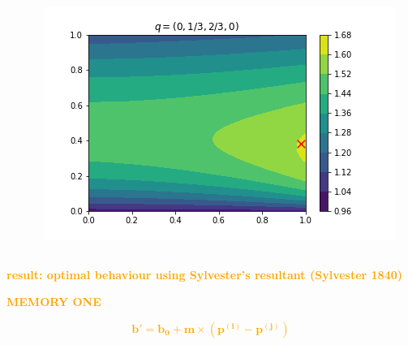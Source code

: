 \documentclass{beamer}
\begin{document}
\begin{frame}
    \begin{columns}
        \begin{column}{.5\textwidth}
            
        \end{column}
        \begin{column}{.5\textwidth}
            \includegraphics[width=\textwidth]{reactive}
        \end{column}
    \end{columns}
    \pause
    \centering
    \vspace{2mm}
    \textbf{\textcolor{orange}{result: optimal behaviour using Sylvester's resultant (Sylvester 1840)}}
\end{frame}

\begin{frame}
    \begin{center}
    \Large{
    \textbf{\textcolor{orange}{MEMORY ONE}}}
    \end{center}
\end{frame}

\begin{frame}
    \begin{center}
        \vspace{-.5cm}
        \textcolor{orange}{
        \[\mathbf{ b'= b_0 + m \times (p^{(i)} - p^{(j)})}\]}
        \vspace{.1cm}

        
    \end{center}
\end{frame}
\end{document}

